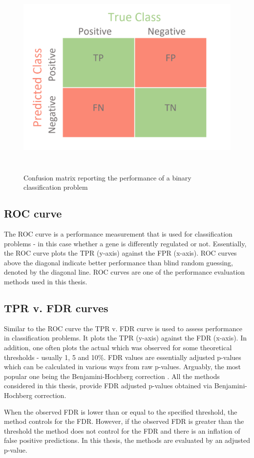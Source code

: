 \begin{figure}[!htb]
\begin{center}
\includegraphics[width=6in,height=4in]{../figures/confusion_matrix.png}
\end{center}
\caption{Confusion matrix reporting the performance of a binary classification problem \citep{confusion_matrix}}
\label{fig:confusion_matrix}
\end{figure}
\FloatBarrier

\subsection{ROC curve}
The ROC curve is a performance measurement that is used for classification problems - in this case whether a gene is differently regulated or not. Essentially, the ROC curve plots the TPR (y-axis) against the FPR (x-axis). ROC curves above the diagonal indicate better performance than blind random guessing, denoted by the diagonal line. ROC curves are one of the performance evaluation methods used in this thesis.

\subsection{TPR v. FDR curves}
Similar to the ROC curve the TPR v. FDR curve is used to assess performance in classification problems. It plots the TPR (y-axis) against the FDR (x-axis). In addition, one often plots the actual which was observed for some theoretical thresholds - usually 1, 5 and 10\%. FDR values are essentially adjusted p-values which can be calculated in various ways from raw p-values. Arguably, the most popular one being the Benjamini-Hochberg correction \citep{BH_correction}. All the methods considered in this thesis, provide FDR adjusted p-values obtained via Benjamini-Hochberg correction.

When the observed FDR is lower than or equal to the specified threshold, the method controls for the FDR. However, if the observed FDR is greater than the threshold the method does not control for the FDR and there is an inflation of false positive predictions. In this thesis, the methods are evaluated by an adjusted p-value.
